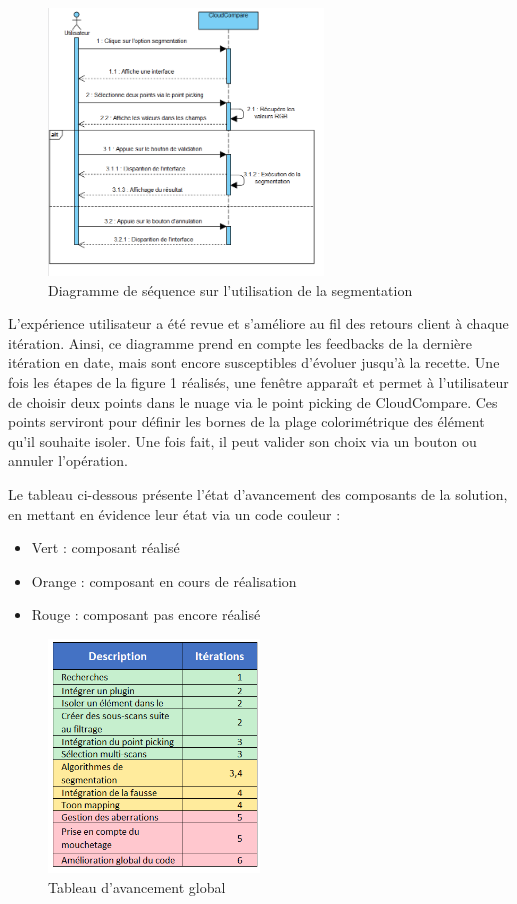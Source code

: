 \documentclass[12pt,titlepage,french]{article}
\begin{document}
\begin{figure}[H]
\center
  \includegraphics[width=0.65\textwidth]{./img/sequDiagrSegmentation.PNG}
  \caption{\label{} Diagramme de séquence sur l'utilisation de la segmentation}
\end{figure}

L'expérience utilisateur a été revue et s'améliore au fil des retours client à chaque itération. Ainsi, ce diagramme prend en compte les feedbacks de la dernière itération en date, mais sont encore susceptibles d'évoluer jusqu'à la recette. Une fois les étapes de la figure 1 réalisés, une fenêtre apparaît et permet à l'utilisateur de choisir deux points dans le nuage via le point picking de CloudCompare. Ces points serviront pour définir les bornes de la plage colorimétrique des élément qu'il souhaite isoler. Une fois fait, il peut valider son choix via un bouton ou annuler l'opération. \newline

Le tableau ci-dessous présente l'état d'avancement des composants de la solution, en mettant en évidence leur état via un code couleur :
\begin{itemize}
    \item Vert : composant réalisé
    \item Orange : composant en cours de réalisation
    \item Rouge : composant pas encore réalisé
\end{itemize}

\begin{figure}[H]
\center \includegraphics[width=0.5\textwidth]{./img/avancement.png}
  \caption{\label{} Tableau d'avancement global}
\end{figure}
\end{document}
